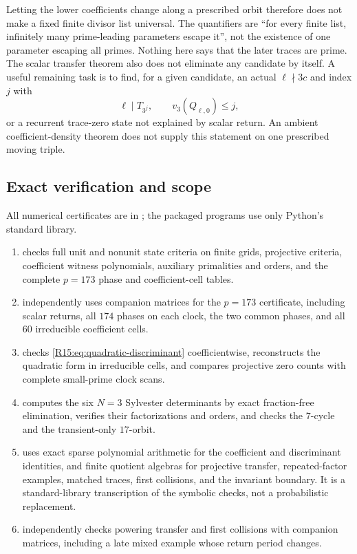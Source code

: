 \documentclass[11pt,a4paper]{article}
\theoremstyle{definition}\newtheorem{definition}[theorem]{Definition}
\theoremstyle{remark}\newtheorem{remark}[theorem]{Remark}
\begin{document}
Letting the lower coefficients change along a prescribed orbit
therefore does not make a fixed finite divisor list universal.
The quantifiers are ``for every finite list, infinitely many prime-leading
parameters escape it'', not the existence of one parameter escaping
all primes. Nothing here says that the later traces are prime.
The scalar transfer theorem also does not eliminate any candidate by
itself. A useful remaining task is to find, for a given candidate,
an actual $\ell\nmid3c$ and index $j$ with
\[
 \ell\mid T_{3^j},\qquad v_3(Q_{\ell,0})\le j,
\]
or a recurrent trace-zero state not explained by scalar return.
An ambient coefficient-density theorem does not supply this statement
on one prescribed moving triple.

\subsection{Exact verification and scope}

All numerical certificates are in ; the packaged
programs use only Python's standard library.
\begin{enumerate}
\item {} checks full unit and
nonunit state criteria on finite grids, projective criteria, coefficient
witness polynomials, auxiliary primalities and orders, and the complete
$p=173$ phase and coefficient-cell tables.
\item {} independently
uses companion matrices for the $p=173$ certificate, including scalar
returns, all $174$ phases on each clock, the two common phases, and
all $60$ irreducible coefficient cells.
\item {} checks
\eqref{R15:eq:quadratic-discriminant} coefficientwise, reconstructs the
quadratic form in irreducible cells, and compares projective zero counts
with complete small-prime clock scans.
\item {} computes the six $N=3$
Sylvester determinants by exact fraction-free elimination, verifies
their factorizations and orders, and checks the $7$-cycle and the
transient-only $17$-orbit.
\item {} uses exact sparse
polynomial arithmetic for the coefficient and discriminant identities,
and finite quotient algebras for projective transfer, repeated-factor
examples, matched traces, first collisions, and the invariant boundary.
It is a standard-library transcription of the symbolic checks,
not a probabilistic replacement.
\item {} independently
checks powering transfer and first collisions with companion matrices,
including a late mixed example whose return period changes.
\end{enumerate}
\end{document}

